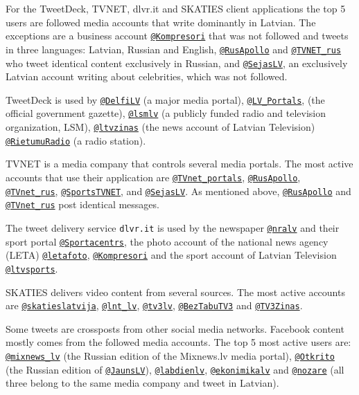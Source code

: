 \documentclass{IOS-Book-Article}
\makeatletter
\newcommand{\sn}[1]{\href{https://twitter.com/#1}{\texttt{@#1}}}
\makeatother
\begin{document}
For the TweetDeck, TVNET, dlvr.it and SKATIES client applications the top 5 users are followed media accounts that write dominantly in Latvian. The exceptions are a business account \sn{Kompresori} that was not followed and tweets in three languages: Latvian, Russian and English, \sn{RusApollo} and \sn{TVNET\_rus} who tweet identical content exclusively in Russian, and \sn{SejasLV}, an exclusively Latvian account writing about celebrities, which was not followed.


TweetDeck is used by \sn{DelfiLV} (a major media portal), \sn{LV\_Portals}, (the official government gazette), \sn{lsmlv} (a publicly funded radio and television organization, LSM), \sn{ltvzinas} (the news account of Latvian Television) \sn{RietumuRadio} (a radio station). 

TVNET is a media company that controls several media portals. The most active accounts that use their application are \sn{TVnet\_portals}, \sn{RusApollo}, \sn{TVnet\_rus}, \sn{SportsTVNET}, and \sn{SejasLV}. As mentioned above, \sn{RusApollo} and \sn{TVnet\_rus} post identical messages.

The tweet delivery service \texttt{dlvr.it} is used by the newspaper \sn{nralv} and their sport portal \sn{Sportacentrs}, the photo account of the national news agency (LETA) \sn{letafoto}, \sn{Kompresori} and the sport account of Latvian Television \sn{ltvsports}.

SKATIES delivers video content from several sources. The most active accounts are \sn{skatieslatvija}, \sn{lnt\_lv}, \sn{tv3lv}, \sn{BezTabuTV3} and \sn{TV3Zinas}.

Some tweets are crossposts from other social media networks. Facebook content mostly comes from the followed media accounts. The top 5 most active users are: \sn{mixnews\_lv} (the Russian edition of the Mixnews.lv media portal), \sn{Otkrito} (the Russian edition of \sn{JaunsLV}), \sn{labdienlv}, \sn{ekonimikalv} and \sn{nozare} (all three belong to the same media company and tweet in Latvian).
\end{document}
